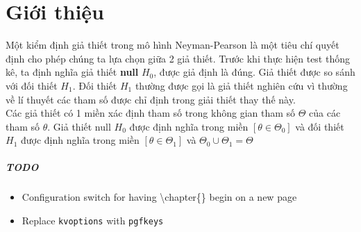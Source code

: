 \chapter{Giới thiệu}
Một kiểm định giả thiết trong mô hình Neyman-Pearson là một tiêu chí quyết định 
cho phép chúng ta lựa chọn giữa 2 giả thiết. Trước khi thực hiện test thống kê, 
ta định nghĩa giả thiết \textbf{null} $H_0$, được giả định là đúng. Giả thiết được
so sánh với đối thiết $H_1$. Đối thiết $H_1$ thường được gọi là giả thiết nghiên cứu
vì thường về lí thuyết các tham số được chỉ định trong giải thiết thay thế này. \\

Các giả thiết có 1 miền xác định tham số  trong không gian tham số $\Theta$ của 
các tham số $\theta$. Giả thiết null $H_0$ được định nghĩa trong miền 
$[\theta \in \Theta_0]$ và đối thiết $H_1$ được định nghĩa trong miền
$[\theta \in \Theta_1]$ và $\Theta_0 \cup \Theta_1 = \Theta$

\paragraph{TODO}
\begin{itemize}
	\item Configuration switch for having \textbackslash chapter\{\} begin on a new page
	\item Replace \texttt{kvoptions} with \texttt{pgfkeys}
\end{itemize}